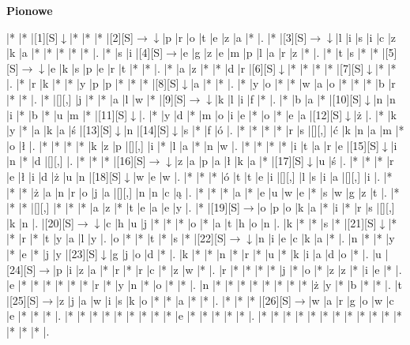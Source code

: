 \documentclass[11pt]{article}
\newcommand\drarr{$\rightarrow \!\!\!\!\! \downarrow$}
\newcommand\rarr{$\rightarrow$}
\newcommand\darr{$\downarrow$}
\begin{document}
\begin{PuzzleClues}{\textbf{Pionowe}\\}
\end{PuzzleClues}\newpage%

\noindent\begin{Puzzle}{14}{33}|*	|*	|[1][S]\darr	|*	|*	|*	|[2][S]\drarr	|p	|r	|o	|t	|e	|z	|a	|*	|.
|*	|[3][S]\drarr	|l	|i	|s	|i	|c	|z	|k	|a	|*	|*	|*	|*	|*	|.
|*	|s	|i	|[4][S]\rarr	|e	|g	|z	|e	|m	|p	|l	|a	|r	|z	|*	|.
|*	|t	|s	|*	|*	|[5][S]\drarr	|e	|k	|s	|p	|e	|r	|t	|*	|*	|.
|*	|a	|z	|*	|*	|d	|r	|[6][S]\darr	|*	|*	|*	|*	|[7][S]\darr	|*	|*	|.
|*	|r	|k	|*	|*	|y	|p	|p	|*	|*	|*	|[8][S]\darr	|a	|*	|*	|.
|*	|y	|o	|*	|*	|w	|a	|o	|*	|*	|*	|b	|r	|*	|*	|.
|*	|[][,]{ }	|j	|*	|*	|a	|l	|w	|*	|[9][S]\drarr	|k	|l	|i	|f	|*	|.
|*	|b	|a	|*	|[10][S]\darr	|n	|n	|i	|*	|b	|*	|u	|m	|*	|[11][S]\darr	|.
|*	|y	|d	|*	|m	|o	|i	|e	|*	|o	|*	|e	|a	|[12][S]\darr	|ż	|.
|*	|k	|y	|*	|a	|k	|a	|ś	|[13][S]\darr	|n	|[14][S]\darr	|s	|*	|f	|ó	|.
|*	|*	|*	|*	|r	|s	|[][,]{ }	|ć	|k	|n	|a	|m	|*	|o	|ł	|.
|*	|*	|*	|*	|k	|z	|p	|[][,]{ }	|i	|*	|l	|a	|*	|n	|w	|.
|*	|*	|*	|*	|i	|t	|a	|r	|e	|[15][S]\darr	|i	|n	|*	|d	|[][,]{ }	|.
|*	|*	|*	|[16][S]\drarr	|z	|a	|p	|a	|ł	|k	|a	|*	|[17][S]\darr	|u	|ś	|.
|*	|*	|*	|r	|e	|ł	|i	|d	|ż	|u	|n	|[18][S]\darr	|w	|e	|w	|.
|*	|*	|*	|ó	|t	|t	|e	|i	|[][,]{ }	|l	|s	|i	|a	|[][,]{ }	|i	|.
|*	|*	|*	|ż	|a	|n	|r	|o	|j	|a	|[][,]{ }	|n	|n	|c	|ą	|.
|*	|*	|*	|a	|*	|e	|u	|w	|e	|*	|s	|w	|g	|z	|t	|.
|*	|*	|*	|[][,]{ }	|*	|*	|*	|a	|z	|*	|t	|e	|a	|e	|y	|.
|*	|[19][S]\rarr	|o	|p	|o	|k	|a	|*	|i	|*	|r	|s	|[][,]{ }	|k	|n	|.
|[20][S]\drarr	|c	|h	|u	|j	|*	|*	|*	|o	|*	|a	|t	|h	|o	|n	|.
|k	|*	|*	|s	|*	|[21][S]\darr	|*	|*	|r	|*	|t	|y	|a	|l	|y	|.
|o	|*	|*	|t	|*	|s	|*	|[22][S]\drarr	|n	|i	|e	|c	|k	|a	|*	|.
|n	|*	|*	|y	|*	|e	|*	|j	|y	|[23][S]\darr	|g	|j	|o	|d	|*	|.
|k	|*	|*	|n	|*	|r	|*	|u	|*	|k	|i	|a	|d	|o	|*	|.
|u	|[24][S]\rarr	|p	|i	|z	|a	|*	|r	|*	|r	|c	|*	|z	|w	|*	|.
|r	|*	|*	|*	|*	|j	|*	|o	|*	|z	|z	|*	|i	|e	|*	|.
|e	|*	|*	|*	|*	|*	|*	|r	|*	|y	|n	|*	|o	|*	|*	|.
|n	|*	|*	|*	|*	|*	|*	|*	|*	|ż	|y	|*	|b	|*	|*	|.
|t	|[25][S]\rarr	|z	|j	|a	|w	|i	|s	|k	|o	|*	|*	|a	|*	|*	|.
|*	|*	|*	|[26][S]\rarr	|w	|a	|r	|g	|o	|w	|c	|e	|*	|*	|*	|.
|*	|*	|*	|*	|*	|*	|*	|*	|*	|e	|*	|*	|*	|*	|*	|.
|*	|*	|*	|*	|*	|*	|*	|*	|*	|*	|*	|*	|*	|*	|*	|.\end{Puzzle}
\end{document}
